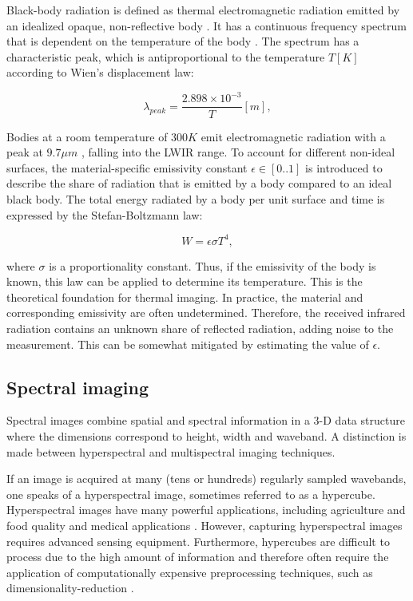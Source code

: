 \documentclass{l4proj}
\begin{document}
Black-body radiation is defined as thermal electromagnetic radiation emitted by an idealized opaque, non-reflective body \citep{young_sears_2012}. It has a continuous frequency spectrum that is dependent on the temperature of the body \citep{kogure_thermodynamic_2007}. The spectrum has a characteristic peak, which is antiproportional to the temperature $T [K]$ according to Wien's displacement law:

\begin{equation}
  \lambda_{peak} = \frac{2.898 \times 10^{-3}}{T} [m],
\end{equation}

Bodies at a room temperature of $300 K$ emit electromagnetic radiation with a peak at $9.7 \mu m$ \citep{jarc_graz_2007}, falling into the LWIR range. To account for different non-ideal surfaces, the material-specific emissivity constant $\epsilon \in [0..1]$ is introduced to describe the share of radiation that is emitted by a body compared to an ideal black body. The total energy radiated by a body per unit surface and time is expressed by the Stefan-Boltzmann law:

\begin{equation}
  W = \epsilon \sigma T^4,
\end{equation}

where $\sigma$ is a proportionality constant. Thus, if the emissivity of the body is known, this law can be applied to determine its temperature. This is the theoretical foundation for thermal imaging. In practice, the material and corresponding emissivity are often undetermined. Therefore, the received infrared radiation contains an unknown share of reflected radiation, adding noise to the measurement. This can be somewhat mitigated by estimating the value of $\epsilon$.

\subsection{Spectral imaging}

Spectral images combine spatial and spectral information in a 3-D data structure where the dimensions correspond to height, width and waveband. 
A distinction is made between hyperspectral and multispectral imaging techniques. 

If an image is acquired at many (tens or hundreds) regularly sampled wavebands, one speaks of a hyperspectral image, sometimes referred to as a hypercube. Hyperspectral images have many powerful applications, including agriculture and food quality \citep{dale_hyperspectral_2013} and medical applications \citep{lu_medical_2014}. However, capturing hyperspectral images requires advanced sensing equipment. Furthermore, hypercubes are difficult to process due to the high amount of information and therefore often require the application of computationally expensive preprocessing techniques, such as dimensionality-reduction \citep{qin_hyperspectral_2013}.
\end{document}
